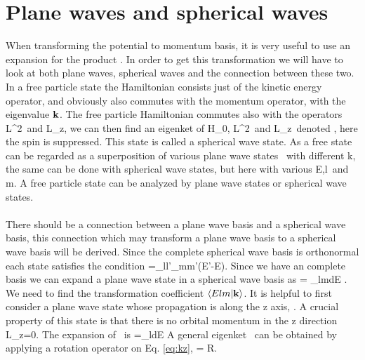 \chapter{Plane waves and spherical waves}\label{partiellbolge}

When transforming the potential to momentum basis, it is very useful to use an
expansion for the product \sd {}\sd.  In order to get
this transformation we will have to look at both plane waves, spherical waves
and the connection between these two.  In a free particle state the Hamiltonian
consists just of the kinetic energy operator, and obviously also commutes with
the momentum operator, with the eigenvalue $ \bold k$. The free
particle Hamiltonian commutes also with the operators \sd \bold L^2\sd\, and
\sd L_z\sd, we can then find an eigenket of \sd H_0, \bold L^2\sd\, and \sd
L_z\sd\, denoted \sd {}\sd, here the spin is suppressed. This state is
called a spherical wave state. As a free state can be regarded as a
superposition of various plane wave states \sd {}\sd\,  with
different \sd\bold k\sd, the same can be done with spherical wave states, but
here with various \sd E,l\sd\, and \sd m\sd. A free particle state can be analyzed by plane wave states or
spherical wave states.\\ 
\\
There should be a connection between a plane wave basis and a spherical wave basis, this connection which may transform a plane wave basis to a spherical wave basis will be derived. Since the complete spherical wave basis is orthonormal each state satisfies the condition 
\beq
{}=\delta_{ll'}\delta_{mm'}\delta(E'-E).
\eeq
Since we have an complete basis we can expand a plane wave state in a spherical wave basis as
\beq
{}= \sum_{lm}\int dE .
\eeq
We need to find the transformation coefficient $\langle Elm|\bold k\rangle$. It is 
helpful to first consider a plane wave state whose propagation is along the z 
axis, \sd {}\sd. A crucial property of this state is that 
there is no orbital momentum in the z direction
\beq
L_z=0.
\eeq
The expansion of \sd {} \sd \, is 
\be
{}=\sum_{l}\int dE 
\label{eq:kz}
\ee
A general eigenket \sd{}\sd\, can be obtained by applying a rotation operator on Eq. \eqref{eq:kz},
\beq
{}= \mathcal R.
\eeq\\
\\
